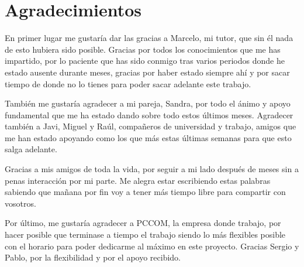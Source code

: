 
\chapter*{Agradecimientos}

\thispagestyle{empty}
\vspace{1cm}

En primer lugar me gustaría dar las gracias a Marcelo, mi tutor, que sin él nada de esto hubiera sido posible.
Gracias por todos los conocimientos que me has impartido, por lo paciente que has sido conmigo tras varios periodos donde he estado ausente durante meses, gracias por haber estado siempre ahí y por sacar tiempo de donde no lo tienes para poder sacar adelante este trabajo.

También me gustaría agradecer a mi pareja, Sandra, por todo el ánimo y apoyo fundamental que me ha estado dando sobre todo estos últimos meses. Agradecer también a Javi, Miguel y Raúl, compañeros de universidad y trabajo, amigos que me han estado apoyando como los que más estas últimas semanas para que esto salga adelante.

Gracias a mis amigos de toda la vida, por seguir a mi lado después de meses sin a penas interacción por mi parte. 
Me alegra estar escribiendo estas palabras sabiendo que mañana por fin voy a tener más tiempo libre para compartir con vosotros.

Por último, me gustaría agradecer a PCCOM, la empresa donde trabajo, por hacer posible que terminase a tiempo el trabajo siendo lo más flexibles posible con el horario para poder dedicarme al máximo en este proyecto. Gracias Sergio y Pablo, por la flexibilidad y por el apoyo recibido.

\cleardoublepage %
